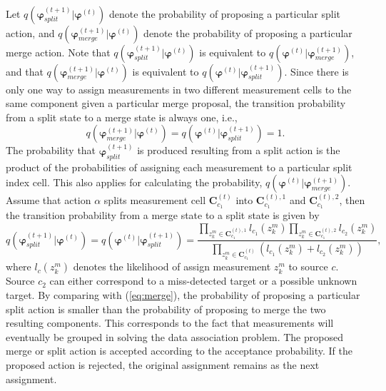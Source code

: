 ~\\
Let $q(\boldsymbol{\varphi}^{(t+1)}_{split}|\boldsymbol{\varphi}^{(t)})$ denote the probability of proposing a particular split action, and $q(\boldsymbol{\varphi}^{(t+1)}_{merge}|\boldsymbol{\varphi}^{(t)})$ denote the probability of proposing a particular merge action. Note that $q(\boldsymbol{\varphi}^{(t+1)}_{split}|\boldsymbol{\varphi}^{(t)})$ is equivalent to $q(\boldsymbol{\varphi}^{(t)}|\boldsymbol{\varphi}^{(t+1)}_{merge})$, and that $q(\boldsymbol{\varphi}^{(t+1)}_{merge}|\boldsymbol{\varphi}^{(t)})$ is equivalent to $q(\boldsymbol{\varphi}^{(t)}|\boldsymbol{\varphi}^{(t+1)}_{split})$. Since there is only one way to assign measurements in two different measurement cells to the same component given a particular merge proposal, the transition probability from a split state to a merge state is always one, i.e., 
\begin{equation}
    q(\boldsymbol{\varphi}^{(t+1)}_{merge}|\boldsymbol{\varphi}^{(t)}) = q(\boldsymbol{\varphi}^{(t)}|\boldsymbol{\varphi}^{(t+1)}_{split}) = 1.
    \label{eq:merge}
\end{equation}
The probability that $\boldsymbol{\varphi}^{(t+1)}_{split}$ is produced resulting from a split action is the product of the probabilities of assigning each measurement to a particular split index cell. This also applies for calculating the probability, $q(\boldsymbol{\varphi}^{(t)}|\boldsymbol{\varphi}^{(t+1)}_{merge})$. Assume that action $\alpha$ splits measurement cell $\mathbf{C}_{c_1}^{(t)}$ into $\mathbf{C}_{c_1}^{(t),1}$ and $\mathbf{C}_{c_1}^{(t),2}$, then the transition probability from a merge state to a split state is given by
\begin{equation}
    q(\boldsymbol{\varphi}^{(t+1)}_{split}|\boldsymbol{\varphi}^{(t)}) = q(\boldsymbol{\varphi}^{(t)}|\boldsymbol{\varphi}^{(t+1)}_{split}) = \frac{\prod_{z^m_k\in\mathbf{C}_{c_1}^{(t),1}}l_{c_1}(z^m_k)\prod_{z^m_k\in\mathbf{C}_{c_1}^{(t),2}}l_{c_2}(z^m_k)}{\prod_{z^m_k\in\mathbf{C}_{c_1}^{(t)}}(l_{c_1}(z^m_k)+l_{c_2}(z^m_k))},
    \label{eq:split}
\end{equation}
where $l_c(z^m_k)$ denotes the likelihood of assign measurement $z^m_k$ to source $c$. Source $c_2$ can either correspond to a miss-detected target or a possible unknown target. By comparing with (\ref{eq:merge}), the probability of proposing a particular split action is smaller than the probability of proposing to merge the two resulting components. This corresponds to the fact that measurements will eventually be grouped in solving the data association problem. The proposed merge or split action is accepted according to the acceptance probability. If the proposed action is rejected, the original assignment remains as the next assignment. 